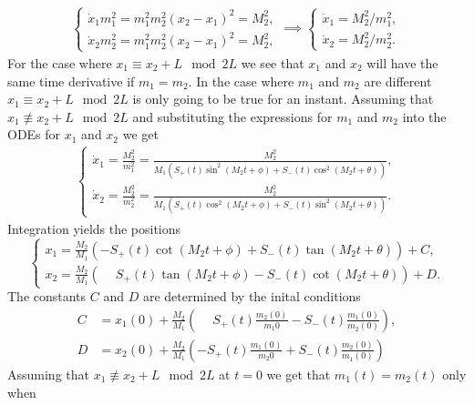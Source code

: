 \documentclass[english,master]{liumaiex}
\theoremstyle{plain}
\theoremstyle{definition}
\begin{document}
\begin{align}
\left\{ \begin{aligned}
	\dot{x}_1m_1^2 = m_1^2m_2^2(x_2 - x_1)^2 = M_2^2, \\
	\dot{x}_2m_2^2 = m_1^2m_2^2(x_2 - x_1)^2 = M_2^2,
\end{aligned} \right. 
\implies \left\{ \begin{aligned}
	\dot{x}_1 = M_2^2/m_1^2, \\
	\dot{x}_2 = M_2^2/m_2^2.
\end{aligned} \right.
\end{align}
For the case where $x_1 \equiv x_2 + L \mod 2L$ we see that $x_1$ and $x_2$ will have the same time derivative if $m_1 = m_2$. In the case where $m_1$ and $m_2$ are different $x_1 \equiv x_2 + L \mod 2L$ is only going to be true for an instant. Assuming that $x_1 \not \equiv x_2 + L \mod 2L$ and substituting the expressions for $m_1$ and $m_2$ into the ODEs for $x_1$ and $x_2$ we get
\begin{align}
\left\{ \begin{aligned}
	\dot{x}_1 = \frac{M_2^2}{m_1^2} = \frac{M_2^2}
		{M_1(S_+(t)\sin^2(M_2 t + \phi) + S_-(t)\cos^2(M_2 t + \theta))}, \\
	\dot{x}_2 = \frac{M_2^2}{m_2^2} = \frac{M_2^2}
		{M_1(S_+(t)\cos^2(M_2 t + \phi) + S_-(t)\sin^2(M_2 t + \theta))}.
\end{aligned} \right.
\end{align}
Integration yields the positions
\begin{equation}
\left\{ \begin{aligned}
	x_1 = \frac{M_2}{M_1}(-S_+(t)\cot(M_2t + \phi) + S_-(t)\tan(M_2t + \theta)) + C,\\
	x_2 = \frac{M_2}{M_1}(\phantom{-}S_+(t)\tan(M_2t + \phi) - S_-(t)\cot(M_2t + \theta)) + D.
\end{aligned} \right.
\end{equation}
%
The constants $C$ and $D$ are determined by the inital conditions
\begin{equation}
\begin{aligned}
	C &= x_1(0) + \frac{M_2}{M_1}(\phantom{-}S_+(t)\frac{m_2(0)}{m_1{0}} - S_-(t)\frac{m_1(0)}{m_2(0)}), \\
	D &= x_2(0) + \frac{M_2}{M_1}(-S_+(t)\frac{m_1(0)}{m_2{0}} + S_-(t)\frac{m_2(0)}{m_1(0)})
\end{aligned}
\end{equation}
%
Assuming that $x_1 \not \equiv x_2 + L \mod 2L$ at $t = 0$ we get that $m_1(t) = m_2(t)$ only when
\end{document}

